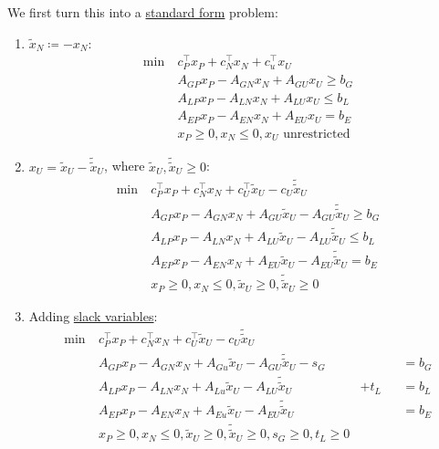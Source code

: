 We first turn this into a \hyperref[def:standard-form]{standard form} problem:
\begin{enumerate}
	\item \(\widetilde{x}_N \coloneqq -x_N\):
	      \[
		      \begin{aligned}
			      \min~ & c^{\top}_P x_P + c^{\top}_N x_N + c^{\top}_u x_U \\
			            & A_{GP}x_P -A_{GN}x_N + A_{GU}x_U\geq b_G         \\
			            & A_{LP}x_P -A_{LN}x_N + A_{LU}x_U \leq b_L        \\
			            & A_{EP}x_P -A_{EN}x_N + A_{EU}x_U = b_E           \\
			            & x_P\geq 0, x_N \leq 0, x_U \text{ unrestricted}
		      \end{aligned}
	      \]
	\item \(x_U = \widetilde{x}_U - \widetilde{\widetilde{x}}_U\), where \(\widetilde{x}_U, \widetilde{\widetilde{x}}_U \geq 0\):
	      \[
		      \begin{aligned}
			      \min~ & c^{\top}_P x_P + c^{\top}_N x_N + c^{\top}_U \widetilde{x}_U - c_U \widetilde{\widetilde{x}}_U \\
			            & A_{GP}x_P -A_{GN}x_N + A_{GU}\widetilde{x}_U -A_{GU}\widetilde{\widetilde{x}}_U \geq b_G       \\
			            & A_{LP}x_P -A_{LN}x_N + A_{LU}\widetilde{x}_U -A_{LU}\widetilde{\widetilde{x}}_U\leq b_L        \\
			            & A_{EP}x_P -A_{EN}x_N + A_{EU}\widetilde{x}_U -A_{EU}\widetilde{\widetilde{x}}_U= b_E           \\
			            & x_P\geq 0, x_N \leq 0, \widetilde{x}_U \geq 0, \widetilde{\widetilde{x}}_U\geq 0
		      \end{aligned}
	      \]
	\item Adding \hyperref[def:slack-variable]{slack variables}:
	      \[
		      \begin{alignedat}{3}
			      \min~ & c^{\top}_P x_P + c^{\top}_N x_N + c^{\top}_U \widetilde{x}_U - c_U \widetilde{\widetilde{x}}_U    \\
			      & A_{GP}x_P -A_{GN}x_N + A_{Gu}\widetilde{x}_U -A_{GU}\widetilde{\widetilde{x}}_U - s_G &       && = b_G \\
			      & A_{LP}x_P -A_{LN}x_N + A_{Lu}\widetilde{x}_U -A_{LU}\widetilde{\widetilde{x}}_U       & + t_L && = b_L \\
			      & A_{EP}x_P -A_{EN}x_N + A_{Eu}\widetilde{x}_U -A_{EU}\widetilde{\widetilde{x}}_U       &       && = b_E \\
			      & x_P\geq 0, x_N \leq 0, \widetilde{x}_U \geq 0, \widetilde{\widetilde{x}}_U\geq 0, s_G\geq 0, t_L \geq 0
		      \end{alignedat}
	      \]
\end{enumerate}

